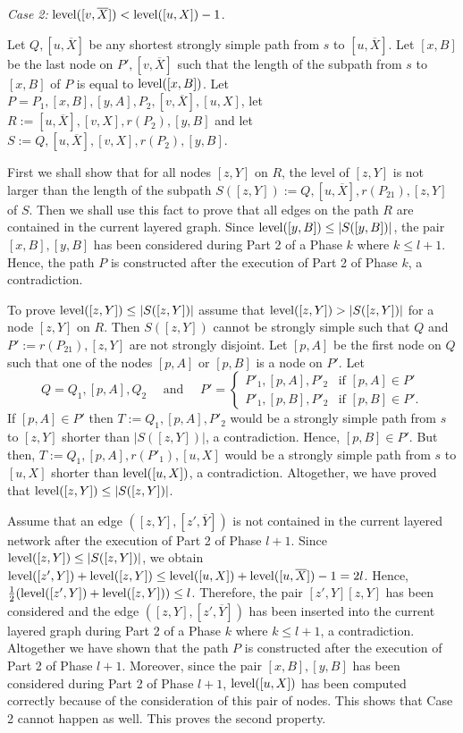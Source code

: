 \documentclass[12pt,twoside,a4paper]{article}
\def\lev{{\rm level}}
\begin{document}
\medskip
\noindent
{\em Case 2:} $\lev([v,\overline{X}]) < \lev([u,X]) - 1$.

\medskip
Let $Q,[u,\overline{X}]$ be any shortest strongly simple path from $s$ to $[u,\overline{X}]$. 
Let $[x,B]$ be the last node on $P',[v,\overline{X}]$ such that the length of the subpath from $s$ 
to $[x,B]$ of $P$ is equal to $\lev([x,B])$. Let $P = P_1,[x,B],[y,A],P_2,[v,\overline{X}],[u,X]$,
let $R := [u,\overline{X}],[v,X],r(P_2),[y,B]$ and let 
$S := Q,[u,\overline{X}],[v,X],r(P_2),[y,B]$.

First we shall show that for all nodes $[z,Y]$ on $R$, the level of $[z,Y]$ is not larger than
the length of the subpath $S([z,Y]) := Q,[u,\overline{X}],r(P_{21}),[z,Y]$ of $S$. Then we shall use 
this fact to prove that all edges on the path $R$ are contained in the current layered graph. 
Since $\lev([y,B]) \leq |S([y,B])|$, the pair $[x,B],[y,B]$ has been considered during Part 2
of a Phase $k$ where $k \leq l+1$. Hence, the path $P$ is constructed after the execution of 
Part 2 of Phase $k$, a contradiction.

To prove $\lev([z,Y]) \leq |S([z,Y])|$ assume that $\lev([z,Y]) > |S([z,Y])|$ for a node $[z,Y]$
on $R$. Then $S([z,Y])$ cannot be strongly simple such that $Q$ and $P' := r(P_{21}),[z,Y]$ are
not strongly disjoint. Let $[p,A]$ be the first node on $Q$ such that one of the nodes
$[p,A]$ or $[p,B]$ is a node on $P'$. Let 
$$Q = Q_1,[p,A],Q_2 \quad \mbox{ and } \quad 
P' = \left\{ \begin{array}{ll}
               P'_1,[p,A],P'_2 & \mbox{if $[p,A] \in P'$} \\
               P'_1,[p,B],P'_2 & \mbox{if $[p,B] \in P'$.} 
              \end{array} \right.
$$
If $[p,A] \in P'$ then $T := Q_1,[p,A],P'_2$ would be a strongly simple path from $s$ to $[z,Y]$ 
shorter than $|S([z,Y])|$, a contradiction. Hence, $[p,B] \in P'$. But then,
$T := Q_1,[p,A],r(P'_1),[u,X]$ would be a strongly simple path from $s$ to $[u,X]$ shorter than
$\lev([u,X])$, a contradiction. Altogether, we have proved that $\lev([z,Y]) \leq |S([z,Y])|$.

Assume that an edge $([z,Y],[z',\overline{Y}])$ is not contained in the current layered network
after the execution of Part 2 of Phase $l+1$. Since $\lev([z,Y]) \leq |S([z,Y])|$, we obtain
$\lev([z',Y]) + \lev([z,Y]) \leq \lev([u,X]) + \lev([u,\overline{X}]) - 1 = 2l$. Hence,
$\frac{1}{2}(\lev([z',Y]) + \lev([z,Y])) \leq l$. Therefore, the pair $[z',Y][z,Y]$ has been
considered and the edge $([z,Y],[z',\overline{Y}])$ has been inserted into the current layered 
graph during Part 2 of a Phase $k$ where $k \leq l+1$, a contradiction. Altogether we have shown 
that the path $P$ is constructed after the execution of Part 2 of Phase $l+1$.
Moreover, since the pair $[x,B],[y,B]$ has been considered during Part 2 of Phase $l+1$,
$\lev([u,X])$ has been computed correctly because of the consideration of this pair of nodes.
This shows that Case 2 cannot happen as well. This proves the second property.
\end{document}
